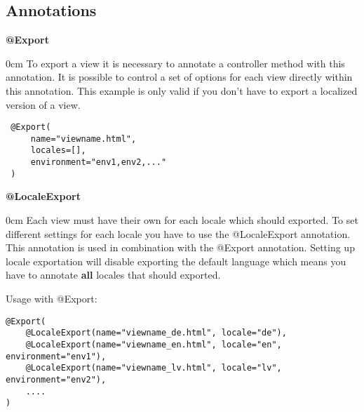 \subsection{Annotations}


\noindent \textbf{@Export}\\
\vspace{-1em}
\begin{adjustwidth}{\parindent}{0cm}
To export a view it is necessary to annotate a controller method with this annotation. It is possible to control a set of options for each view directly within this annotation. This example is only valid if you don't have to export a localized version of a view.

\begin{verbatim}
 @Export(
     name="viewname.html",
     locales=[],
     environment="env1,env2,..."
 )
\end{verbatim}
\end{adjustwidth}
\vspace{1em}


\noindent \textbf{@LocaleExport}\\
\vspace{-1em}
\begin{adjustwidth}{\parindent}{0cm}
Each view must have their own for each locale which should exported. To set different settings for each locale you have to use the @LocaleExport annotation. This annotation is used in combination with the @Export annotation. Setting up locale exportation will disable exporting the default language which means you have to annotate \textbf{all} locales that should exported.

Usage with @Export:
\begin{verbatim}
@Export(
    @LocaleExport(name="viewname_de.html", locale="de"),
    @LocaleExport(name="viewname_en.html", locale="en", environment="env1"),
    @LocaleExport(name="viewname_lv.html", locale="lv", environment="env2"),
    ....
)
\end{verbatim}
\end{adjustwidth}
\vspace{1em}


